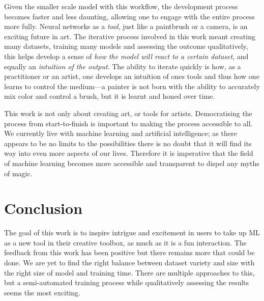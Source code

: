 \documentclass{article}
\begin{document}
Given the smaller scale model with this workflow, the development process becomes faster and less daunting, allowing one to engage with the entire process more fully. Neural networks as a \textit{tool}, just like a paintbrush or a camera, is an exciting future in art. The iterative process involved in this work meant creating many datasets, training many models and assessing the outcome qualitatively, this helps develop a sense of \textit{how the model will react to a certain dataset}, and equally an \textit{intuition of the output}. The ability to iterate quickly is how, as a practitioner or an artist, one develops an intuition of ones tools and thus how one learns to control the medium---a painter is not born with the ability to accurately mix color and control a brush, but it is learnt and honed over time.

This work is not only about creating art, or tools for artists. Democratising the process from start-to-finish is important to making the process accessible to all. We currently live with machine learning and artificial intelligence; as there appears to be no limits to the possibilities there is no doubt that it will find its way into even more aspects of our lives. Therefore it is imperative that the field of machine learning becomes more accessible and transparent to dispel any myths of magic.

\section{Conclusion}
The goal of this work is to inspire intrigue and excitement in users to take up ML as a new tool in their creative toolbox, as much as it is a fun interaction. The feedback from this work has been positive but there remains more that could be done. We are yet to find the right balance between dataset variety and size with the right size of model and training time. There are multiple approaches to this, but a semi-automated training process while qualitatively assessing the results seems the most exciting.
\end{document}
